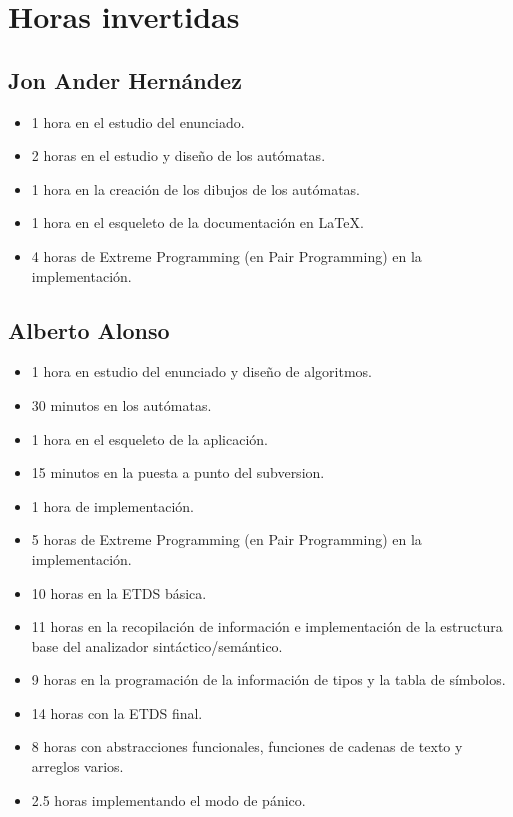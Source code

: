 
\chapter{Horas invertidas}

    \section{Jon Ander Hernández}
    
        \begin{itemize}
            \item 1 hora en el estudio del enunciado.
            \item 2 horas en el estudio y diseño de los autómatas.
            \item 1 hora en la creación de los dibujos de los autómatas.
            \item 1 hora en el esqueleto de la documentación en \LaTeX.
            \item 4 horas de Extreme Programming (en Pair Programming) en la implementación.
         \end{itemize}
    
    \section{Alberto Alonso}
    
        \begin{itemize}
            \item 1 hora en estudio del enunciado y diseño de algoritmos.
            \item 30 minutos en los autómatas.
            \item 1 hora en el esqueleto de la aplicación.
            \item 15 minutos en la puesta a punto del subversion.
            \item 1 hora de implementación.
            \item 5 horas de Extreme Programming (en Pair Programming) en la implementación.
			\item 10 horas en la ETDS básica.
			\item 11 horas en la recopilación de información e implementación de la estructura base del analizador sintáctico/semántico.
			\item 9 horas en la programación de la información de tipos y la tabla de símbolos.
			\item 14 horas con la ETDS final.
			\item 8 horas con abstracciones funcionales, funciones de cadenas de texto y arreglos varios.
			\item 2.5 horas implementando el modo de pánico.
        \end{itemize}
    
